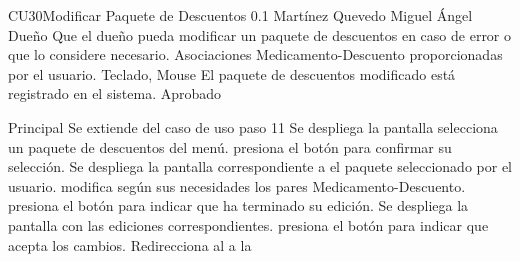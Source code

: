 \begin{UseCase}{CU30}{Modificar Paquete de Descuentos}
{
}
    {
	\color{Gray} 0.1
    }
    {
	\color{Gray}Mart\'inez Quevedo Miguel \'Angel
    }
    {
	\color{Gray}
    }
    {
	Due\~no
    }
    {
	Que el due\~no pueda modificar un paquete de descuentos en caso de error o
	que lo considere necesario.
    }
    {
	Asociaciones Medicamento-Descuento proporcionadas por el usuario.
    }
    {
	Teclado, Mouse
    }
    {}
    {}
    {}
    {
	El paquete de descuentos modificado est\'a registrado en el sistema.
    }
    {}
    {}
    {}
    {
		Aprobado
	}
\end{UseCase}


\begin{UCtrayectoria}{Principal}
    \UCpaso Se extiende del caso de uso  paso 11
    \UCpaso Se despliega la pantalla 
    \UCpaso [\UCactor] selecciona un paquete de descuentos del men\'u.
    \UCpaso [\UCactor] presiona el bot\'on  para confirmar su selecci\'on.
    \UCpaso Se despliega la pantalla 
    correspondiente a el paquete seleccionado por el usuario.
    \UCpaso [\UCactor] modifica seg\'un sus necesidades los pares Medicamento-Descuento.
    \UCpaso [\UCactor] presiona el bot\'on  para indicar que ha terminado su edici\'on.
    \UCpaso Se despliega la pantalla  con las ediciones correspondientes.
    \UCpaso [\UCactor] presiona el bot\'on  para indicar que acepta los cambios.
    \UCpaso Redirecciona al \UCactor a la   
\end{UCtrayectoria}


\begin{UCtrayectoriaA}{}{}
\end{UCtrayectoriaA}

